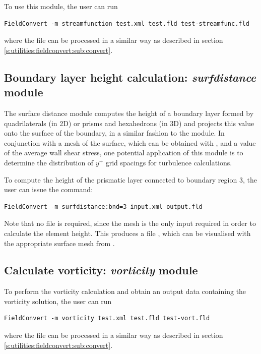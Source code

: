 To use this module, the user can run
\begin{lstlisting}[style=BashInputStyle]
FieldConvert -m streamfunction test.xml test.fld test-streamfunc.fld
\end{lstlisting}
where the file  can be processed in a similar
way as described in section \ref{s:utilities:fieldconvert:sub:convert}.

%
%
%
\subsection{Boundary layer height calculation: \textit{surfdistance} module}

The surface distance module computes the height of a boundary layer formed by
quadrilaterals (in 2D) or prisms and hexahedrons (in 3D)
and projects this value onto the surface of the boundary, in a similar fashion
to the  module. In conjunction with a mesh of the surface, which
can be obtained with , and a value of the average wall shear
stress, one potential application of this module is to determine the
distribution of $y^+$ grid spacings for turbulence calculations.

To compute the height of the prismatic layer connected to boundary region 3, the
user can issue the command:
\begin{lstlisting}[style=BashInputStyle]
FieldConvert -m surfdistance:bnd=3 input.xml output.fld
\end{lstlisting}
Note that no  file is required, since the mesh is the only input
required in order to calculate the element height. This produces a file
, which can be visualised with the appropriate surface
mesh from .

%
%
%
\subsection{Calculate vorticity: \textit{vorticity} module}
To perform the vorticity calculation and obtain an output
data containing the vorticity solution, the user can run
\begin{lstlisting}[style=BashInputStyle]
FieldConvert -m vorticity test.xml test.fld test-vort.fld
\end{lstlisting}
where the file  can be processed in a similar
way as described in section \ref{s:utilities:fieldconvert:sub:convert}.
%
%
%

